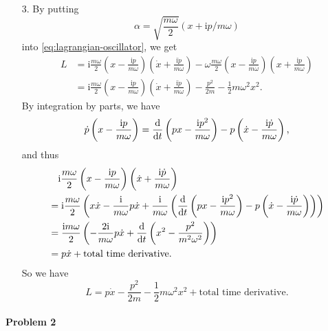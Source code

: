 \documentclass[hyperref, a4paper]{article}
\newcommand*{\ii}{\mathrm{i}}
\begin{document}
\begin{itemize}
\item[3.] By putting 
\begin{equation}
    \alpha = \sqrt{\frac{m \omega}{2}} (x + \ii p / m \omega) 
\end{equation}
into \eqref{eq:lagrangian-oscillator}, we get 
\[
    \begin{aligned}
        L &= \ii \frac{m \omega}{2} \left( x - \frac{\ii p}{m \omega} \right) 
        \left( \dot{x} + \frac{\ii \dot{p}}{m \omega} \right) 
        - \omega \frac{m \omega}{2} \left( x - \frac{\ii p}{m \omega} \right) 
        \left( x + \frac{\ii p}{m \omega} \right) \\
        &= \ii \frac{m \omega}{2} \left( x - \frac{\ii p}{m \omega} \right) 
        \left( \dot{x} + \frac{\ii \dot{p}}{m \omega} \right) 
        - \frac{p^2}{2m} - \frac{1}{2} m \omega^2 x^2.
    \end{aligned}
\]
By integration by parts, we have 
\[
    \dot{p} \left( x - \frac{\ii p}{m \omega} \right) 
    = \dv{t} \left( px - \frac{\ii p^2}{m \omega} \right) 
    - p \left( \dot{x} - \frac{\ii \dot{p}}{m \omega} \right),
\]
and thus 
\[
    \begin{aligned}
        &\quad \ii \frac{m \omega}{2} \left( x - \frac{\ii p}{m \omega} \right) 
        \left( \dot{x} + \frac{\ii \dot{p}}{m \omega} \right) \\
        &= \ii \frac{m \omega}{2} \left( x \dot{x} - \frac{\ii}{m \omega} p \dot{x} + \frac{\ii}{m \omega} \left( \dv{t} \left( px - \frac{\ii p^2}{m \omega} \right) 
        - p \left( \dot{x} - \frac{\ii \dot{p}}{m \omega} \right) \right) \right) \\
        &= \frac{\ii m \omega}{2} \left( - \frac{2 \ii}{m \omega} p \dot{x} + 
        \dv{t} \left( x^2 - \frac{p^2}{m^2 \omega^2} \right) \right) \\
        &= p \dot{x} + \text{total time derivative}.
    \end{aligned}
\]
So we have 
\begin{equation}
    L = p \dot{x} - \frac{p^2}{2m} - \frac{1}{2} m \omega^2 x^2 + \text{total time derivative}.
\end{equation}

\end{itemize}

\paragraph{Problem 2} 
\end{document}
